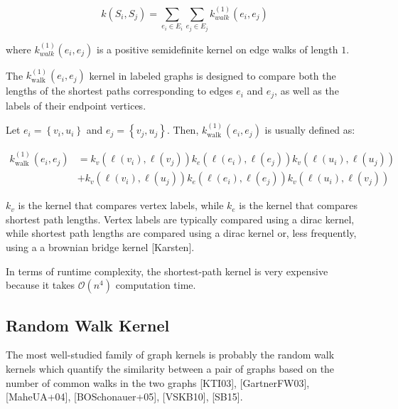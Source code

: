 \begin{equation}
k\left(S_{i}, S_{j}\right)=\sum_{e_{i} \in E_{i}} \sum_{e_{j} \in E_{j}} k_{w a l k}^{(1)}\left(e_{i}, e_{j}\right)
\end{equation}

where $k_{w a l k}^{(1)}\left(e_{i}, e_{j}\right)$ is a positive semidefinite kernel on edge walks of length $1 .$

The $k_{\text {walk }}^{(1)}\left(e_{i}, e_{j}\right)$ kernel in labeled graphs is designed to compare both the lengths of the shortest paths corresponding to edges $e_{i}$ and $e_{j}$, as well as the labels of their endpoint vertices.

Let $e_{i}=\left\{v_{i}, u_{i}\right\}$ and $e_{j}=\left\{v_{j}, u_{j}\right\}$. Then, $k_{\text {walk }}^{(1)}\left(e_{i}, e_{j}\right)$ is usually defined as:

\begin{equation}
\begin{aligned}
k_{\text {walk }}^{(1)}\left(e_{i}, e_{j}\right) &=k_{v}\left(\ell\left(v_{i}\right), \ell\left(v_{j}\right)\right) k_{e}\left(\ell\left(e_{i}\right), \ell\left(e_{j}\right)\right) k_{v}\left(\ell\left(u_{i}\right), \ell\left(u_{j}\right)\right) \\
&+k_{v}\left(\ell\left(v_{i}\right), \ell\left(u_{j}\right)\right) k_{e}\left(\ell\left(e_{i}\right), \ell\left(e_{j}\right)\right) k_{v}\left(\ell\left(u_{i}\right), \ell\left(v_{j}\right)\right)
\end{aligned}
\end{equation}

$k_{v}$ is the kernel that compares vertex labels, while $k_{e}$ is the kernel that compares shortest path lengths. Vertex labels are typically compared using a dirac kernel, while shortest path lengths are compared using a dirac kernel or, less frequently, using a a brownian bridge kernel [Karsten].

In terms of runtime complexity, the shortest-path kernel is very expensive because it takes $\mathcal{O}\left(n^{4}\right)$ computation time.

\subsection{Random Walk Kernel}
The most well-studied family of graph kernels is probably the random walk kernels which quantify the similarity between a pair of graphs based on the number of common walks in the two graphs [KTI03], [GartnerFW03], [MaheUA+04], [BOSchonauer+05], [VSKB10], [SB15].

